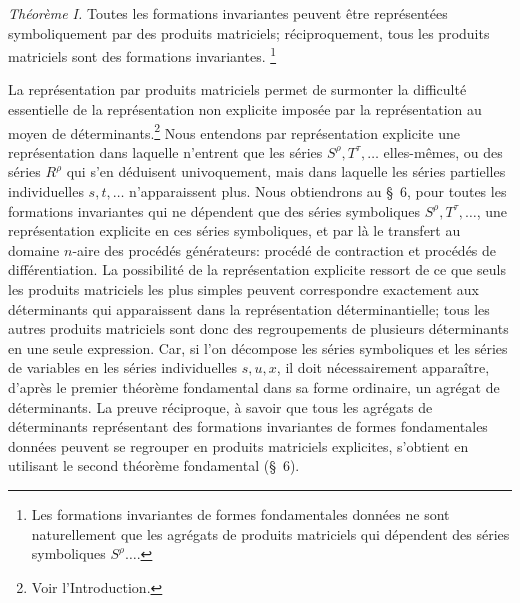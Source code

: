 \documentclass[11pt]{article}
\begin{document}
\emph{Théorème I.} \og Toutes les formations invariantes peuvent être représentées symboliquement par des produits matriciels; réciproquement, tous les produits matriciels sont des formations invariantes. \fg{}\footnote{Les formations invariantes de formes fondamentales données ne sont naturellement que les agrégats de produits matriciels qui dépendent des séries symboliques $S^\rho\ldots$.}

La représentation par produits matriciels permet de surmonter la difficulté essentielle de la représentation non explicite imposée par la représentation au moyen de déterminants.\footnote{Voir l'Introduction.} Nous entendons par \og représentation explicite \fg{} une représentation dans laquelle n'entrent que les séries $S^\rho,T^\tau,\ldots$ elles-mêmes, ou des séries $R^\rho$ qui s'en déduisent univoquement, mais dans laquelle les séries partielles individuelles $s,t,\ldots$ n'apparaissent plus. Nous obtiendrons au \S\ 6, pour toutes les formations invariantes qui ne dépendent que des séries symboliques $S^\rho,T^\tau,\ldots$, une représentation explicite en ces séries symboliques, et par là le transfert au domaine $n$-aire des procédés générateurs: procédé de contraction et procédés de différentiation. La possibilité de la représentation explicite ressort de ce que seuls les produits matriciels les plus simples peuvent correspondre exactement aux déterminants qui apparaissent dans la représentation déterminantielle; tous les autres produits matriciels sont donc des regroupements de plusieurs déterminants en une seule expression. Car, si l'on décompose les séries symboliques et les séries de variables en les séries individuelles $s,u,x$, il doit nécessairement apparaître, d'après le premier théorème fondamental dans sa forme ordinaire, un agrégat de déterminants. La preuve réciproque, à savoir que tous les agrégats de déterminants représentant des formations invariantes de formes fondamentales données peuvent se regrouper en produits matriciels explicites, s'obtient en utilisant le second théorème fondamental (\S\ 6).
\end{document}
